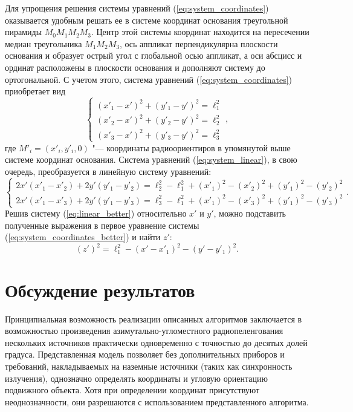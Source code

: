 \documentclass[a4paper,12pt]{article}
\begin{document}
Для упрощения решения системы уравнений (\ref{eq:system_coordinates}) оказывается удобным
решать ее в системе координат основания треугольной пирамиды $M_0 M_1 M_2 M_3$. Центр этой системы координат
находится на пересечении медиан треугольника $M_1 M_2 M_3$, ось аппликат перпендикулярна плоскости основания
и образует острый угол с глобальной осью аппликат, а оси абсцисс и ординат расположены в плоскости основания и
дополняют систему до ортогональной. С учетом этого, система уравнений (\ref{eq:system_coordinates}) приобретает
вид
\begin{equation}\label{eq:system_coordinates_better}
    \begin{cases}
        \left(x'_1 - x'\right)^2 + \left(y'_1 - y'\right)^2 = \ell_1^2 \\
        \left(x'_2 - x'\right)^2 + \left(y'_2 - y'\right)^2 = \ell_2^2 \\
        \left(x'_3 - x'\right)^2 + \left(y'_3 - y'\right)^2 = \ell_3^2
    \end{cases},
\end{equation}
где $M'_i = \left(x'_i, y'_i, 0\right)$ "--- координаты радиоориентиров в упомянутой выше системе координат основания.
Система уравнений (\ref{eq:system_linear}), в свою очередь, преобразуется в линейную систему уравнений:
\begin{equation}\label{eq:linear_better}
    \begin{cases}
        2x' \left(x'_1 - x'_2\right) + 2 y' \left(y'_1 - y'_2\right) = \ell_2^2 - \ell_1^2 + \left(x'_1\right)^2 - \left(x'_2\right)^2 + \left(y'_1\right)^2 - \left(y'_2\right)^2 \\
        2x' \left(x'_1 - x'_3\right) + 2 y' \left(y'_1 - y'_3\right) = \ell_3^2 - \ell_1^2 + \left(x'_1\right)^2 - \left(x'_3\right)^2 + \left(y'_1\right)^2 - \left(y'_3\right)^2
    \end{cases}.
\end{equation}
Решив систему (\ref{eq:linear_better}) относительно $x'$ и $y'$, можно подставить полученные выражения в первое
уравнение системы (\ref{eq:system_coordinates_better}) и найти $z'$:
\begin{equation*}
    \left(z'\right)^2 = \ell_1^2 - \left(x' - x'_1\right)^2 - \left(y' - y'_1\right)^2.
\end{equation*}

\section{Обсуждение результатов}
Принципиальная возможность реализации описанных алгоритмов заключается в возможностью произведения азимутально-угломестного
радиопеленгования нескольких источников практически одновременно с точностью до десятых долей градуса. Представленная модель
позволяет без дополнительных приборов и требований, накладываемых на наземные источники (таких как синхронность излучения),
однозначно определять координаты и угловую ориентацию подвижного объекта. Хотя при определении координат
присутствуют неоднозначности, они разрешаются с использованием представленного алгоритма.
\end{document}
